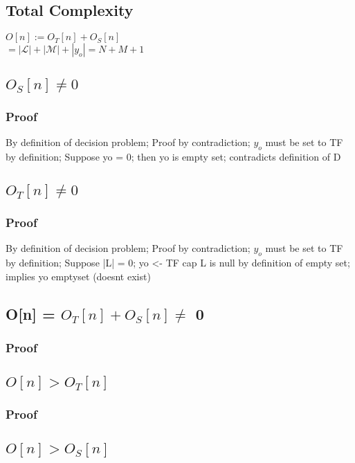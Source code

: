 \documentclass[11pt]{article}
\begin{document}
\subsection{Total Complexity}
\begin{center}
$O[n] := O_T[n] + O_S[n]$
\\ \vspace{2mm}
$= |\mathcal{L}| + |\mathcal{M}| + |y_o| = N + M + 1$
\end{center}


\subsection{$O_S[n] \neq 0$}
\subsubsection{Proof}
By definition of decision problem; Proof by contradiction; $y_o$ must be set to TF by definition; Suppose yo = 0; then yo is empty set; contradicts definition of D

\subsection{$O_T[n] \neq 0$}
\subsubsection{Proof}
By definition of decision problem; Proof by contradiction; $y_o$ must be set to TF by definition; Suppose |L| = 0; yo <- TF cap L is null by definition of empty set; implies yo emptyset (doesnt exist)

\subsection{O[n] = $O_T[n] + O_S[n] \neq$ 0}
\subsubsection{Proof}

\subsection{$O[n] > O_T[n]$}
\subsubsection{Proof}

\subsection{$O[n] > O_S[n]$}
\end{document}
